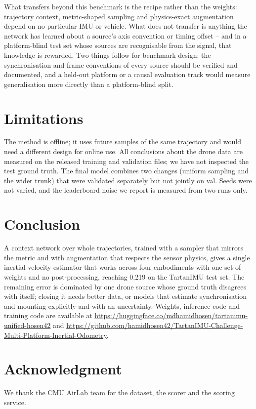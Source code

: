 \documentclass[letterpaper,10pt,conference]{ieeeconf}
\newcommand{\hfrepo}{\url{https://huggingface.co/mdhamidhosen/tartanimu-unified-hosen42}}
\newcommand{\ghrepo}{\url{https://github.com/hamidhosen42/TartanIMU-Challenge-Multi-Platform-Inertial-Odometry}}
\begin{document}
What transfers beyond this benchmark is the recipe rather than the weights: trajectory context, metric-shaped
sampling and physics-exact augmentation depend on no particular IMU or vehicle. What does not transfer is anything the
network has learned about a source's axis convention or timing offset -- and in a platform-blind test set whose
sources are recognisable from the signal, that knowledge is rewarded. Two things follow for benchmark design: the
synchronisation and frame conventions of every source should be verified and documented, and a held-out platform or
a causal evaluation track would measure generalisation more directly than a platform-blind split.

\section{Limitations}
The method is offline; it uses future samples of the same trajectory and would need a different design for online
use. All conclusions about the drone data are measured on the released training and validation files; we have not
inspected the test ground truth. The final model combines two changes (uniform sampling and the wider trunk) that
were validated separately but not jointly on val. Seeds were not varied, and the leaderboard noise we report is
measured from two runs only.

\section{Conclusion}
A context network over whole trajectories, trained with a sampler that mirrors the metric and with augmentation that
respects the sensor physics, gives a single inertial velocity estimator that works across four embodiments with one
set of weights and no post-processing, reaching 0.219 on the TartanIMU test set. The remaining error is dominated by
one drone source whose ground truth disagrees with itself; closing it needs better data, or models that estimate
synchronisation and mounting explicitly and with an uncertainty. Weights, inference code and training code are
available at \hfrepo{} and \ghrepo.

\section*{Acknowledgment}
We thank the CMU AirLab team for the dataset, the scorer and the scoring service.
\end{document}
